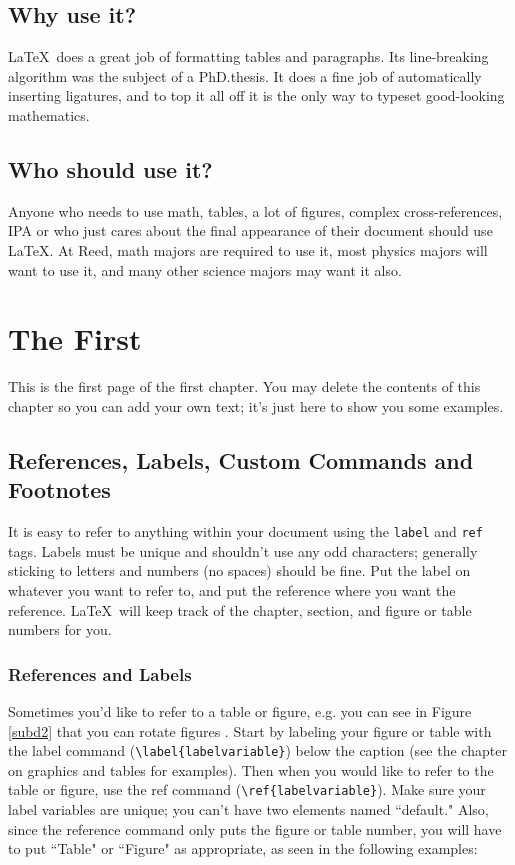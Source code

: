 \documentclass[12pt,twoside]{reedthesis}
\begin{document}
\section{Why use it?}

\LaTeX\ does a great job of formatting tables and paragraphs. Its line-breaking algorithm was the subject of a PhD.\thinspace thesis. It does a fine job of automatically inserting ligatures, and to top it all off it is the only way to typeset good-looking mathematics.

\section{Who should use it?}

Anyone who needs to use math, tables, a lot of figures, complex cross-references, IPA or who just cares about the final appearance of their document should use \LaTeX. At Reed, math majors are required to use it, most physics majors will want to use it, and many other science majors may want it also.

    \chapter{The First}
        This is the first page of the first chapter. You may delete the contents of this chapter so you can add your own text; it's just here to show you some examples.

\section{References, Labels, Custom Commands and Footnotes}
It is easy to refer to anything within your document using the \texttt{label} and \texttt{ref} tags.  Labels must be unique and shouldn't use any odd characters; generally sticking to letters and numbers (no spaces) should be fine. Put the label on whatever you want to refer to, and put the reference where you want the reference. \LaTeX\ will keep track of the chapter, section, and figure or table numbers for you.

\subsection{References and Labels}
Sometimes you'd like to refer to a table or figure, e.g. you can see in Figure \ref{subd2} that you can rotate figures . Start by labeling your figure or table with the label command (\verb=\label{labelvariable}=) below the caption (see the chapter on graphics and tables for examples). Then when you would like to refer to the table or figure, use the ref command (\verb=\ref{labelvariable}=). Make sure your label variables are unique; you can't have two elements named ``default." Also, since the reference command only puts the figure or table number, you will have to put  ``Table" or ``Figure" as appropriate, as seen in the following examples:
\end{document}
